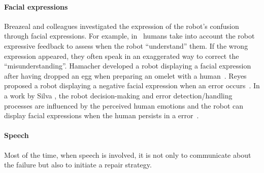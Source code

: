 \documentclass[a4paper,11pt,twoside]{StyleThese}
\begin{document}
\paragraph{Facial expressions} Breazeal and colleagues investigated the expression of the robot's confusion through facial expressions. For example, in~\cite{breazeal_2002_regulation, breazeal_2003_emotion} humans take into account the robot expressive feedback to assess when the robot ``understand'' them. If the wrong expression appeared, they often speak in an exaggerated way to correct the ``misunderstanding''. Hamacher \etal{} developed a robot  displaying a facial expression after having dropped an egg when preparing an omelet with a human~\cite {hamacher_2016_believing}. Reyes \etal{} proposed a robot displaying a negative facial expression when an error occurs~\cite{reyes_2015_positive}. In a work by Silva \etal, the robot decision-making and error detection/handling processes are influenced by the perceived human emotions and the robot can display facial expressions when the human persists in a error~\cite{silva_2016_combining}.

\paragraph{Speech} Most of the time, when speech is involved, it is not only to communicate about the failure but also to initiate a repair strategy. 
\end{document}
